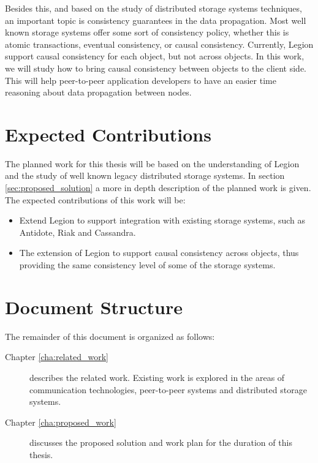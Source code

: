 	Besides this, and based on the study of distributed storage systems techniques, an important topic is consistency guarantees in the data propagation. Most well known storage systems offer some sort of consistency policy, whether this is atomic transactions, eventual consistency, or causal consistency. Currently, Legion support causal consistency for each object, but not across objects. In this work, we will study how to bring causal consistency between objects to the client side. This will help peer-to-peer application developers to have an easier time reasoning about data propagation between nodes.

\section{Expected Contributions}
\label{sec:expected_contributions}
The planned work for this thesis will be based on the understanding of Legion and the study of well known legacy distributed storage systems. In section \ref{sec:proposed_solution} a more in depth description of the planned work is given. The expected contributions of this work will be:
	
\begin{itemize}
\item Extend Legion to support integration with existing storage systems, such as Antidote, Riak and Cassandra.

\item The extension of Legion to support causal consistency across objects, thus providing the same consistency level of some of the storage systems.

\end{itemize}

\section{Document Structure}
\label{document_structure}
The remainder of this document is organized as follows:\par

\begin{description}
\item[Chapter \ref{cha:related_work}] describes the related work. Existing work is explored in the areas of communication technologies, peer-to-peer systems and distributed storage systems.

\item[Chapter \ref{cha:proposed_work}] discusses the proposed solution and work plan for the duration of this thesis.
\end{description}
